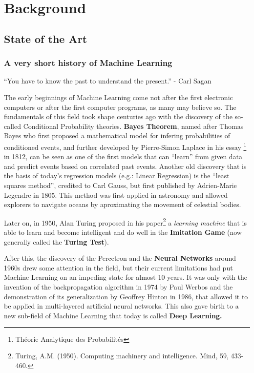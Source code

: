 \chapter{Background}

\section{State of the Art}

\subsection{A very short history of Machine Learning}
``You have to know the past to understand the present.'' - Carl Sagan

The early beginnings of Machine Learning come not after the first electronic 
computers or after the first computer programs, as many may believe so. The 
fundamentals of this field took shape centuries ago with the discovery of the 
so-called Conditional Probability theories. {\bf Bayes Theorem}, named after Thomas 
Bayes who first proposed a mathematical model for infering probabilities of 
conditioned events, and further developed by Pierre-Simon Laplace in his essay 
\footnote{Théorie Analytique des Probabilités} in 1812, can be seen as one of the first models 
that can ``learn'' from given data and predict events based on correlated past events.
Another old discovery that is the basis of today's regression models (e.g.: 
Linear Regression) is the ``least squares method'', credited to Carl Gauss, but 
first published by Adrien-Marie Legendre in 1805. This method was first applied in 
astronomy and allowed explorers to navigate oceans by aproximating the movement of 
celestial bodies.

Later on, in 1950, Alan Turing proposed in his paper\footnote{Turing, A.M. (1950). 
Computing machinery and intelligence. Mind, 59, 433-460.} a {\it learning machine} 
that is able to learn and become intelligent and do well in the {\bf Imitation Game} 
(now generally called the {\bf Turing Test}). 

After this, the discovery of the Percetron and the {\bf Neural Networks} around 1960s drew 
some attention in the field, but their current limitations had put Machine Learning on an 
impeding state for almost 10 years. It was only with the invention of the 
backpropagation algorithm in 1974 by Paul Werbos and the demonstration of its 
generalization by Geoffrey Hinton in 1986, that allowed it to be applied in 
multi-layered artificial neural networks. This also gave birth to a new sub-field 
of Machine Learning that today is called {\bf Deep Learning.}

